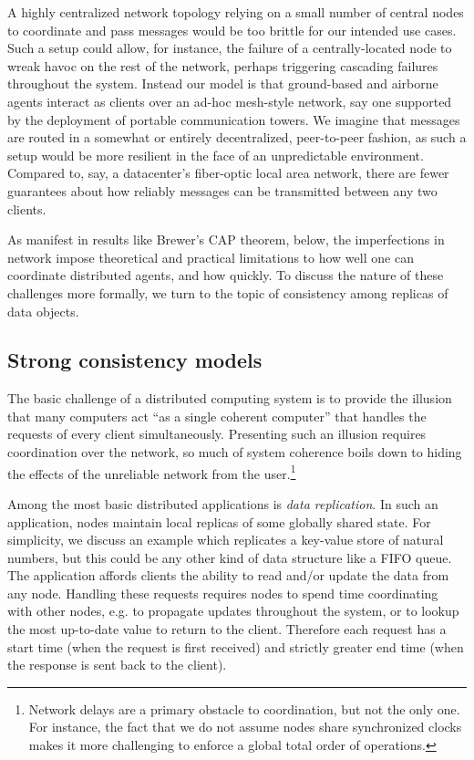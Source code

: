 A highly centralized network topology relying on a small number of
central nodes to coordinate and pass messages would be too brittle for
our intended use cases. Such a setup could allow, for instance, the
failure of a centrally-located node to wreak havoc on the rest of the
network, perhaps triggering cascading failures throughout the
system. Instead our model is that ground-based and airborne agents
interact as clients over an ad-hoc mesh-style network, say one
supported by the deployment of portable communication towers. We
imagine that messages are routed in a somewhat or entirely
decentralized, peer-to-peer fashion, as such a setup would be more
resilient in the face of an unpredictable environment. Compared to,
say, a datacenter's fiber-optic local area network, there are fewer
guarantees about how reliably messages can be transmitted between any
two clients.

As manifest in results like Brewer's CAP theorem, below, the
imperfections in network impose theoretical and practical limitations
to how well one can coordinate distributed agents, and how quickly. To
discuss the nature of these challenges more formally, we turn to the
topic of consistency among replicas of data objects.

\subsection{Strong consistency models}

The basic challenge of a distributed computing system is to provide
the illusion that many computers act ``as a single coherent computer''
\cite{TanenbaumSteen07} that handles the requests of every client
simultaneously. Presenting such an illusion requires coordination over
the network, so much of system coherence boils down to hiding the
effects of the unreliable network from the user.\footnote{Network
delays are a primary obstacle to coordination, but not the only
one. For instance, the fact that we do not assume nodes share
synchronized clocks makes it more challenging to enforce a global
total order of operations.}

Among the most basic distributed applications is \emph{data
replication}. In such an application, nodes maintain local replicas of
some globally shared state. For simplicity, we discuss an example
which replicates a key-value store of natural numbers, but this could
be any other kind of data structure like a FIFO queue. The application
affords clients the ability to read and/or update the data from any
node. Handling these requests requires nodes to spend time
coordinating with other nodes, e.g. to propagate updates throughout
the system, or to lookup the most up-to-date value to return to the
client. Therefore each request has a start time (when the request is
first received) and strictly greater end time (when the response is
sent back to the client).

